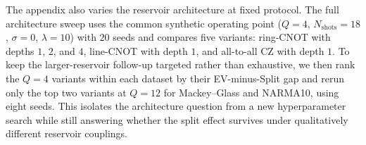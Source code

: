 The appendix also varies the reservoir architecture at fixed protocol. The full architecture sweep uses the common synthetic operating point ($Q=4$, $N_{\mathrm{shots}}=18$, $\sigma=0$, $\lambda=10$) with $20$ seeds and compares five variants: ring-CNOT with depths $1$, $2$, and $4$, line-CNOT with depth $1$, and all-to-all CZ with depth $1$. To keep the larger-reservoir follow-up targeted rather than exhaustive, we then rank the $Q=4$ variants within each dataset by their EV-minus-Split gap and rerun only the top two variants at $Q=12$ for Mackey--Glass and NARMA10, using eight seeds. This isolates the architecture question from a new hyperparameter search while still answering whether the split effect survives under qualitatively different reservoir couplings.
